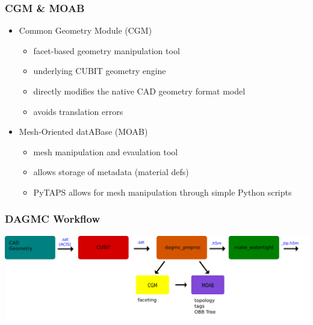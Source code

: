\documentclass[14pt]{beamer}
\begin{document}
\begin{frame}
\frametitle{CGM \& MOAB}
\begin{itemize}
\item Common Geometry Module (CGM)
	\begin{itemize}
	\item facet-based geometry manipulation tool
	\item underlying CUBIT geometry engine
	\item directly modifies the native CAD geometry format model
	\item avoids translation errors
	\end{itemize}
	\vfill
\item Mesh-Oriented datABase (MOAB)
	\begin{itemize}
	\item mesh manipulation and evaulation tool
	\item allows storage of metadata (material defs)
	\item PyTAPS allows for mesh manipulation through simple Python scripts
	\end{itemize}
\end{itemize}
\end{frame}


\begin{frame}
\frametitle{DAGMC Workflow}
\begin{center}
\includegraphics[scale=0.23, trim = 40 200 0 0]{DAGMC_Wrkflw4.png}
\end{center}
\end{frame}
\end{document}
